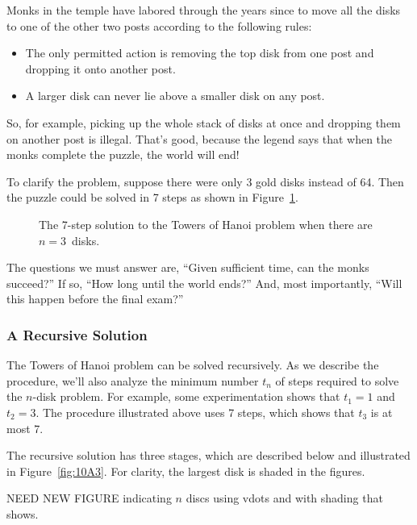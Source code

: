 Monks in the temple have labored through the years since to move all
the disks to one of the other two posts according to the following
rules:
\begin{itemize}
\item The only permitted action is removing the top disk from one post
and dropping it onto another post.
\item A larger disk can never lie above a smaller disk on any post.
\end{itemize}
So, for example, picking up the whole stack of disks at once
and dropping them on another post is illegal.  That's good, because
the legend says that when the monks complete the puzzle, the world
will end!

To clarify the problem, suppose there were only 3 gold disks instead
of 64.  Then the puzzle could be solved in 7 steps as shown in
Figure~\ref{fig:10A2}.

\begin{figure}


\caption{The 7-step solution to the Towers of Hanoi problem when there
are $n = 3$~disks.}

\label{fig:10A2}

\end{figure}

The questions we must answer are, ``Given sufficient time, can the
monks succeed?''  If so, ``How long until the world ends?''  And, most
importantly, ``Will this happen before the final exam?''

\subsubsection{A Recursive Solution}

The Towers of Hanoi problem can be solved recursively.  As we describe
the procedure, we'll also analyze the minimum number $t_n$ of steps
required to solve the $n$-disk problem.  For example, some
experimentation shows that $t_1 = 1$ and $t_2 = 3$.  The procedure
illustrated above uses 7 steps, which shows that $t_3$ is at most 7.

The recursive solution has three stages, which are described below and
illustrated in Figure~\ref{fig:10A3}.
For clarity, the largest disk is shaded in the figures.

\begin{editingnotes}
NEED NEW FIGURE indicating $n$ discs using vdots and with shading that shows.
\end{editingnotes}

